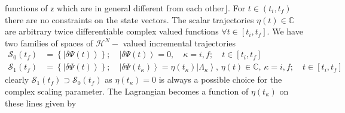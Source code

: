 \documentclass[aps,preprint]{revtex4}
\begin{document}
functions of $\mathsf{z}$ which are in general different from each other$%
\rfloor$. For $t\in\left( t_{i},t_{f}\right) $ there are no constraints on
the state vectors. The scalar trajectories $\eta\left( t\right) \in\mathbb{C}
$ are arbitrary twice differentiable complex valued functions $\forall t\in%
\left[ t_{i},t_{f}\right] $. We have two families of spaces of $\mathcal{H}%
^{N}- $ valued incremental trajectories 
\begin{align}
\mathcal{S}_{0}\left( t_{f}\right) & =\left\{ \left| \delta\Psi\left(
t\right) \right\rangle \right\} ;\quad\left| \delta\Psi\left( t\right)
\right\rangle =0,\quad\kappa=i,f;\quad t\in\left[ t_{i},t_{f}\right] \\
\mathcal{S}_{1}\left( t_{f}\right) & =\left\{ \left| \delta\Psi\left(
t\right) \right\rangle \right\} ;\quad\left| \delta\Psi\left( t_{\kappa
}\right) \right\rangle =\eta\left( t_{\kappa}\right) \left| \Lambda
_{\kappa}\right\rangle ,\,\eta\left( t\right) \in\mathbb{C},\,\kappa
=i,f;\quad t\in\left[ t_{i},t_{f}\right]
\end{align}
clearly $\mathcal{S}_{1}\left( t_{f}\right) \supset\mathcal{S}_{0}\left(
t_{f}\right) $ as $\eta\left( t_{\kappa}\right) =0$ is always a possible
choice for the complex scaling parameter. The Lagrangian becomes a function
of $\eta\left( t_{\kappa}\right) $ on these lines given by 
\end{document}
